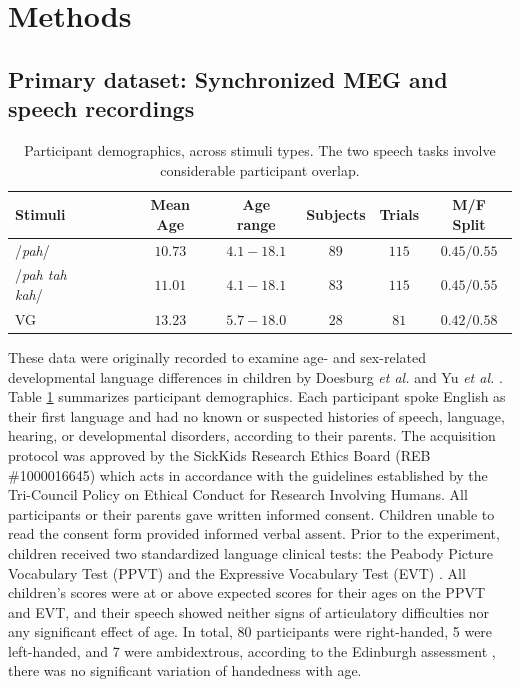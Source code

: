 \documentclass[fleqn,10pt]{wlscirep}
\begin{document}
\section*{Methods}

\subsection*{Primary dataset: Synchronized MEG and speech recordings}

\begin{table}[h]
  \centering
  \begin{tabular}{ l@{}c c c c c }
    \toprule
    \textbf{Stimuli} & \textbf{Mean Age} & \textbf{Age range} & \textbf{Subjects} & \textbf{Trials}  & \textbf{M/F Split} \\
    \midrule
    /{\em pah}/~~~                    & $10.73$ & $4.1-18.1$   &   $89$   &   $115$   &   $0.45/0.55$ \\
    /{\em pah tah kah}/~~~            & $11.01$ & $4.1-18.1$   &   $83$   &   $115$   &   $0.45/0.55$ \\
    VG~~~                             & $13.23$ & $5.7-18.0$   &   $28$   &   $81$    &   $0.42/0.58$  \\
    \bottomrule
  \end{tabular}
  \caption{Participant demographics, across stimuli types. The two speech tasks involve considerable participant overlap.}
  \label{tab:subjects}
\end{table}
These data were originally recorded to examine age- and sex-related developmental language differences in children by Doesburg {\em et al.} \cite{Doesburg2016} and Yu {\em et al.} \cite{Yu2014}. Table \ref{tab:subjects} summarizes participant demographics. Each participant spoke English as their first language and had no known or suspected histories of speech, language, hearing, or developmental disorders, according to their parents. The acquisition protocol was approved by the SickKids Research Ethics Board (REB \#1000016645) which acts in accordance with the guidelines established by the Tri-Council Policy on Ethical Conduct for Research Involving Humans. All participants or their parents gave written informed consent. Children unable to read the consent form provided informed verbal assent. Prior to the experiment, children received two standardized language clinical tests: the Peabody Picture Vocabulary Test (PPVT) \cite{Dunn97} and the Expressive Vocabulary Test (EVT) \cite{EVT}. All children's scores were at or above expected scores for their ages on the PPVT and EVT, and their speech showed neither signs of articulatory difficulties nor any significant effect of age. In total, 80 participants were right-handed, 5 were left-handed, and 7 were ambidextrous, according to the Edinburgh assessment \cite{Oldfield1971}, there was no significant variation of handedness with age. 
\end{document}
